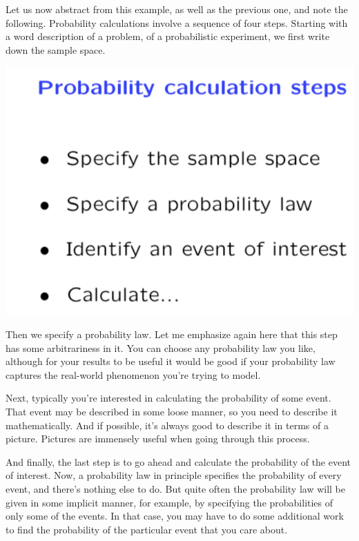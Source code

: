 \documentclass{tufte-handout}
\begin{document}
\vspace{0.7cm}
Let us now abstract from this example, as well as the previous one, and note the following. Probability
calculations involve a sequence of four steps. Starting with a word description of a problem, of a
probabilistic experiment, we first write down the sample space. 

\begin{marginfigure}
  \includegraphics{StepsOfProbCalc}
\end{marginfigure}

Then we specify a probability law. Let me emphasize again here that this step has some arbitrariness in it. You can choose any probability
law you like, although for your results to be useful it would be good if your probability law captures the
real-world phenomenon you're trying to model.

 Next, typically you're interested in calculating the probability
of some event. That event may be described in some loose manner, so you need to describe it
mathematically. And if possible, it's always good to describe it in terms of a picture. Pictures are
immensely useful when going through this process.

And finally, the last step is to go ahead and calculate the probability of the event of interest. Now, a
probability law in principle specifies the probability of every event, and there's nothing else to do. But
quite often the probability law will be given in some implicit manner, for example, by specifying the
probabilities of only some of the events. In that case, you may have to do some additional work to find
the probability of the particular event that you care about.
\end{document}
